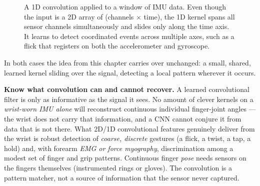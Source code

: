 \begin{goalbox}
\begin{figure}[H]
\caption{A 1D convolution applied to a window of IMU data. Even though the input is a 2D array of (channels $\times$ time), the 1D kernel spans all sensor channels simultaneously and slides only along the time axis. It learns to detect coordinated events across multiple axes, such as a flick that registers on both the accelerometer and gyroscope.}
\label{ch32:fig-imu-1d-conv}
\end{figure}


In both cases the idea from this chapter carries over unchanged: a small, shared,
learned kernel sliding over the signal, detecting a local pattern wherever it
occurs.
\end{goalbox}

\begin{trapbox}
\textbf{Know what convolution can and cannot recover.} A learned
convolutional filter is only as informative as the signal it sees. No amount of
clever kernels on a \emph{wrist-worn IMU alone} will reconstruct continuous
individual finger-joint angles --- the wrist does not carry that
information, and a CNN cannot conjure it from data that is not there. What 2D/1D
convolutional features genuinely deliver from the wrist is robust detection of
\emph{coarse, discrete} gestures (a flick, a twist, a tap, a hold) and, with
forearm \emph{EMG or force myography}, discrimination among a modest set of
finger and grip patterns. Continuous finger \emph{pose} needs sensors on the
fingers themselves (instrumented rings or gloves). The convolution is a
pattern matcher, not a source of information that the sensor never captured.
\end{trapbox}

